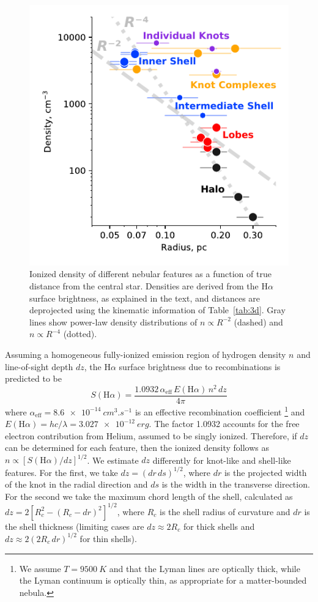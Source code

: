 \documentclass[useAMS, usenatbib]{mnras}
\newcommand\Ha{\ensuremath{\mathrm{H}\alpha}}
\begin{document}
\begin{figure}
  \includegraphics[width=0.8\linewidth]
  {figs/turtle-density-profile}
  \caption{
    Ionized density of different nebular features as a function of true distance from the central star.
    Densities are derived from the \Ha{} surface brightness, as explained in the text,
    and distances are deprojected using the kinematic information of Table~\ref{tab:3d}.
    Gray lines show power-law density distributions of \(n \propto R^{-2}\) (dashed)
    and \(n \propto R^{-4}\) (dotted).
  }
  \label{fig:density-plots}
\end{figure}

Assuming a homogeneous fully-ionized emission region of hydrogen density \(n\) and line-of-sight depth \(dz\), the \Ha{} surface brightness due to recombinations is predicted to be 
\begin{equation}
  \label{eq:sha-density}
  S(\Ha) = \frac{1.0932\, \alpha_{\text{eff}}\, E(\Ha) \, n^2 \, dz} {4\pi}
\end{equation}
where \(\alpha_{\text{eff}} = \SI{8.6e-14}{cm^{3}.s^{-1}}\) is an effective recombination coefficient \citep{Osterbrock:2006a}%
\footnote{We assume \(T = \SI{9500}{K}\) and that the Lyman lines are optically thick, while the Lyman continuum is optically thin, as appropriate for a matter-bounded nebula.}
and \(E(\Ha) = h c / \lambda = \SI{3.027e-12}{erg}\).
The factor \num{1.0932} accounts for the free electron contribution from Helium, assumed to be singly ionized.
Therefore, if \(dz\) can be determined for each feature, then the ionized density follows as \(n \propto [S(\Ha) / dz]^{1/2}\).
We estimate \(dz\) differently for knot-like and shell-like features.
For the first, we take \(dz = (dr\, ds)^{1/2}\), where \(dr\) is the projected width of the knot in the radial direction and \(ds\) is the width in the transverse direction.
For the second we take the maximum chord length of the shell, calculated as \(dz = 2 [R_c^2 - (R_c - dr)^2]^{1/2}\), where \(R_c\) is the shell radius of curvature and \(dr\) is the shell thickness
(limiting cases are \(dz \approx 2 R_c\) for thick shells and \(dz \approx 2 (2 R_c\, dr)^{1/2}\) for thin shells).
\end{document}
